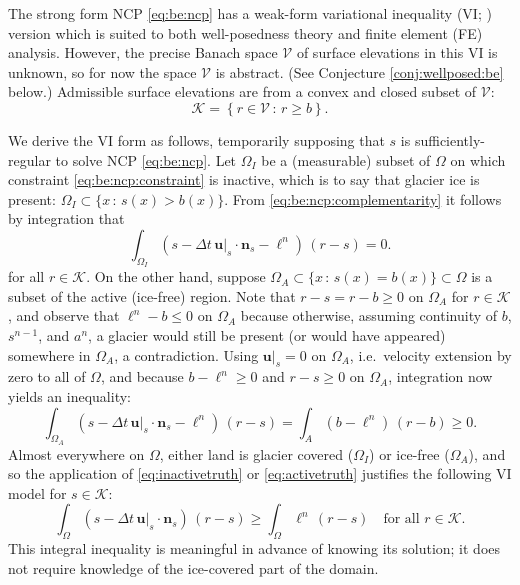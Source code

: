 \documentclass[hidelinks,onefignum,onetabnum,final]{siamart220329}  %
\newcommand{\bn}{\mathbf{n}}
\newcommand{\bu}{\mathbf{u}}
\newcommand{\cK}{\mathcal{K}}
\newcommand{\cV}{\mathcal{V}}
\begin{document}
The strong form NCP \eqref{eq:be:ncp} has a weak-form variational inequality (VI; \cite{KinderlehrerStampacchia1980}) version which is suited to both well-posedness theory and finite element (FE) analysis.  However, the precise Banach space $\cV$ of surface elevations in this VI is unknown, so for now the space $\cV$ is abstract.  (See Conjecture \ref{conj:wellposed:be} below.)  Admissible surface elevations are from a convex and closed subset of $\cV$:
\begin{equation}
\cK = \left\{r \in\cV\,:\,r \ge b\right\}.  \label{eq:be:admissible}
\end{equation}

We derive the VI form \cite{Bueler2021conservation} as follows, temporarily supposing that $s$ is sufficiently-regular to solve NCP \eqref{eq:be:ncp}.  Let $\Omega_I$ be a (measurable) subset of $\Omega$ on which constraint \eqref{eq:be:ncp:constraint} is inactive, which is to say that glacier ice is present: $\Omega_I \subset \{x\,:\,s(x)>b(x)\}$.  From \eqref{eq:be:ncp:complementarity} it follows by integration that
\begin{equation}
\int_{\Omega_I} \left(s - \Delta t\,\bu|_s \cdot \bn_s - \ell^n\right)\,(r-s) = 0.  \label{eq:inactivetruth}
\end{equation}
for all $r\in\cK$.  On the other hand, suppose $\Omega_A \subset \{x\,:\,s(x)=b(x)\} \subset \Omega$ is a subset of the active (ice-free) region.  Note that $r-s=r-b\ge 0$ on $\Omega_A$ for $r\in\cK$, and observe that $\ell^n - b \le 0$ on $\Omega_A$ because otherwise, assuming continuity of $b$, $s^{n-1}$, and $a^n$, a glacier would still be present (or would have appeared) somewhere in $\Omega_A$, a contradiction.  Using $\bu|_s=0$ on $\Omega_A$, i.e.~velocity extension by zero to all of $\Omega$, and because $b-\ell^n \ge 0$ and $r-s\ge 0$ on $\Omega_A$, integration now yields an inequality:
\begin{equation}
\int_{\Omega_A} \left(s - \Delta t\,\bu|_s \cdot \bn_s - \ell^n\right)\,(r-s) = \int_A \left(b - \ell^n\right)\,(r-b) \ge 0.  \label{eq:activetruth}
\end{equation}
Almost everywhere on $\Omega$, either land is glacier covered ($\Omega_I$) or ice-free ($\Omega_A$), and so the application of \eqref{eq:inactivetruth} or \eqref{eq:activetruth} justifies the following VI model for $s \in \cK$:
\begin{equation}
\int_\Omega \left(s - \Delta t\,\bu|_s \cdot \bn_s\right)\,(r-s) \ge \int_\Omega \ell^n \,(r-s) \quad \text{for all } r \in \cK. \label{eq:be:viearly}
\end{equation}
This integral inequality is meaningful in advance of knowing its solution; it does not require knowledge of the ice-covered part of the domain.
	
\end{document}
